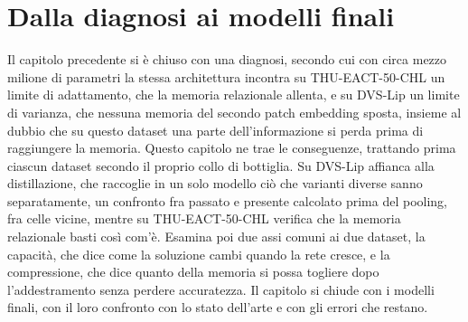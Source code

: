 \chapter{Dalla diagnosi ai modelli finali}
\label{chap:scalabilita}


Il capitolo precedente si è chiuso con una diagnosi, secondo cui con circa mezzo milione di parametri la stessa architettura incontra su THU-EACT-50-CHL un limite di adattamento, che la memoria relazionale allenta, e su DVS-Lip un limite di varianza, che nessuna memoria del secondo patch embedding sposta, insieme al dubbio che su questo dataset una parte dell'informazione si perda prima di raggiungere la memoria. Questo capitolo ne trae le conseguenze, trattando prima ciascun dataset secondo il proprio collo di bottiglia. Su DVS-Lip affianca alla distillazione, che raccoglie in un solo modello ciò che varianti diverse sanno separatamente, un confronto fra passato e presente calcolato prima del pooling, fra celle vicine, mentre su THU-EACT-50-CHL verifica che la memoria relazionale basti così com'è. Esamina poi due assi comuni ai due dataset, la capacità, che dice come la soluzione cambi quando la rete cresce, e la compressione, che dice quanto della memoria si possa togliere dopo l'addestramento senza perdere accuratezza. Il capitolo si chiude con i modelli finali, con il loro confronto con lo stato dell'arte e con gli errori che restano.

